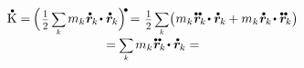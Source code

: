 \nopagebreak\vspace{-0.3em}
\begin{multline}\label{thebalanceofkineticenergy.derivation}
\mathdotabove{\kineticenergyinmechanics} \hspace{.1ex}
= \hspace{-0.2ex} \Bigl( \hspace{.2ex} \smalldisplaystyleonehalf \hspace{.3ex}
\scalebox{.8}{$ \displaystyle \sum_{\smash{k}} $} \hspace{.3ex}
m_{k} \hspace{.1ex} \mathdotabove{\locationvector}_{\hspace{-0.1ex}k} \hspace{-0.3ex} \dotp \mathdotabove{\locationvector}_{\hspace{-0.1ex}k}
\Bigr)^{\hspace{-0.15em}\tikz[baseline=-0.2ex]\draw[black, fill=black] (0,0) circle (.28ex);} \hspace{-0.2ex}
\hspace{-0.1ex} = \hspace{.2ex}
\smalldisplaystyleonehalf \hspace{.3ex} \scalebox{.8}{$ \displaystyle \sum_{\smash{k}} $} \bigl( \hspace{.1ex}
m_{k} \hspace{.1ex} \mathdotdotabove{\locationvector}_{\hspace{-0.1ex}k} \hspace{-0.3ex} \dotp \mathdotabove{\locationvector}_{\hspace{-0.1ex}k} \hspace{-0.1ex}
+ m_{k} \hspace{.1ex} \mathdotabove{\locationvector}_{\hspace{-0.1ex}k} \hspace{-0.3ex} \dotp \mathdotdotabove{\locationvector}_{\hspace{-0.1ex}k}
\bigr)
\\[-0.2em]
%
= \hspace{-0.1ex}
\scalebox{.8}{$ \displaystyle \sum_{\smash{k}} $} \hspace{.3ex}
m_{k} \hspace{.1ex} \mathdotdotabove{\locationvector}_{\hspace{-0.1ex}k} \hspace{-0.3ex} \dotp \mathdotabove{\locationvector}_{\hspace{-0.1ex}k}
= \hspace{-0.1ex}

\end{multline}
